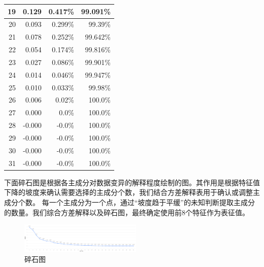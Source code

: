 \documentclass[UTF8]{ctexart}
\begin{document}
\begin{table}[!ht]
\begin{tabular}{|r|r|r|r|}
		19     & 0.129      & 0.417\%  & 99.091\% \\ \hline
		20     & 0.093      & 0.299\%  & 99.39\%  \\ \hline
		21     & 0.078      & 0.252\%  & 99.642\% \\ \hline
		22     & 0.054      & 0.174\%  & 99.816\% \\ \hline
		23     & 0.027      & 0.086\%  & 99.901\% \\ \hline
		24     & 0.014      & 0.046\%  & 99.947\% \\ \hline
		25     & 0.010      & 0.033\%  & 99.98\%  \\ \hline
		26     & 0.006      & 0.02\%   & 100.0\%  \\ \hline
		27     & 0.000      & 0.0\%    & 100.0\%  \\ \hline
		28     & -0.000     & -0.0\%   & 100.0\%  \\ \hline
		29     & -0.000     & -0.0\%   & 100.0\%  \\ \hline
		30     & -0.000     & -0.0\%   & 100.0\%  \\ \hline
		31     & -0.000     & -0.0\%   & 100.0\%  \\ \hline
	\end{tabular}
\end{table}

下面碎石图是根据各主成分对数据变异的解释程度绘制的图。其作用是根据特征值下降的坡度来确认需要选择的主成分个数，我们结合方差解释表用于确认或调整主成分个数。 每一个主成分为一个点，通过“坡度趋于平缓”的未知判断提取主成分的数量。我们综合方差解释以及碎石图，最终确定使用前8个特征作为表征值。

\begin{figure}[H]\centering

	\includegraphics[width=0.52\textwidth,height=0.45\textwidth]{img/4/solid.png} %
	\caption{碎石图} %
	\label{fig:figure 5} %
\end{figure}
\end{document}

